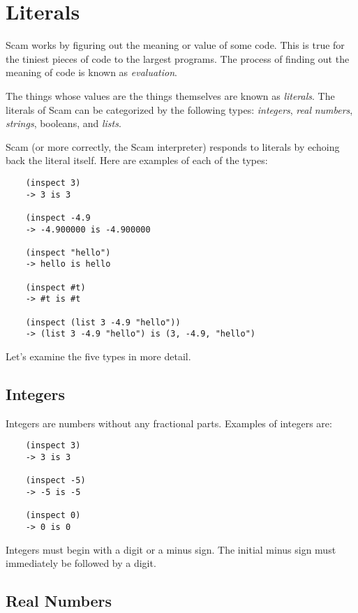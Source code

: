 \chapter{Literals}
\label{Literals}

Scam works by figuring out the meaning or value of some code.
This is true for the tiniest pieces of code to the largest
programs. The process of finding out the meaning of code
is known as {\it evaluation}.

The things whose values are the things themselves are known as
{\it literals}. The literals of Scam can be categorized by the following
types:
{\it integers}, {\it real} {\it numbers}, {\it strings}, {\sc booleans},
and {\it lists}.

Scam (or more correctly, the Scam interpreter) responds to literals
by echoing back the literal itself.
Here are examples of each of the types:

\begin{verbatim}
    (inspect 3)
    -> 3 is 3
     
    (inspect -4.9
    -> -4.900000 is -4.900000
     
    (inspect "hello")
    -> hello is hello
     
    (inspect #t)
    -> #t is #t

    (inspect (list 3 -4.9 "hello"))
    -> (list 3 -4.9 "hello") is (3, -4.9, "hello")
\end{verbatim}
Let's examine the
five types in more detail.

\section{Integers}

Integers are numbers without any fractional parts.
Examples of integers are:

\begin{verbatim}
    (inspect 3)
    -> 3 is 3
    
    (inspect -5)
    -> -5 is -5
    
    (inspect 0)
    -> 0 is 0
\end{verbatim}

Integers must begin with a digit or a minus sign. The initial minus sign
must immediately be followed by a digit.

\section{Real Numbers}

